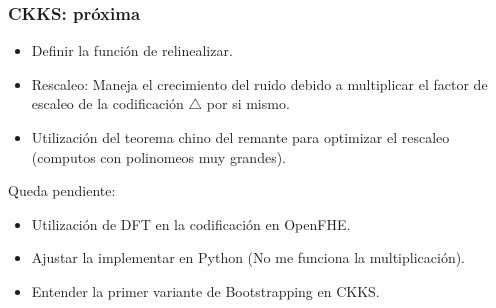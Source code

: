 \documentclass[10pt]{beamer}
\begin{document}

\begin{frame}
  \frametitle{CKKS: próxima}

\begin{itemize}
  \item Definir la función de relinealizar.
  \item Rescaleo: Maneja el crecimiento del ruido debido a multiplicar el factor de escaleo de la codificación $\bigtriangleup$ por si mismo.
    \pause
  \item Utilización del teorema chino del remante para optimizar el rescaleo (computos con
    polinomeos muy grandes).
\end{itemize}
\pause

Queda pendiente:
\begin{itemize}
  \item Utilización de DFT en la codificación en OpenFHE.
  \item Ajustar la implementar en Python (No me funciona la multiplicación).
    \pause
  \item Entender la primer variante de Bootstrapping en CKKS.
\end{itemize}


\end{frame}
\end{document}
